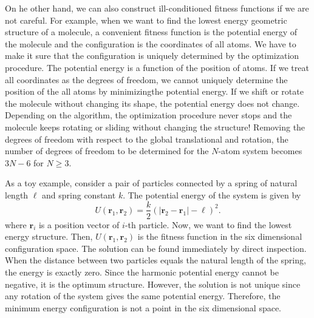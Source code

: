 On he other hand, we can also construct ill-conditioned fitness functions if we are not careful.  For example, when we want to find the lowest energy geometric structure of a molecule, a convenient fitness function is the potential energy of the molecule and the configuration is the coordinates of all atoms. We have to make it sure that the configuration is uniquely determined by the optimization procedure.  The potential energy is a function of the position of atoms.  If we treat all coordinates as the degrees of freedom, we cannot uniquely determine the position of the all atoms by minimizingthe  potential energy.  If we shift or rotate the molecule without changing its shape, the potential energy does not change.  Depending on the algorithm, the optimization procedure never stops and the molecule keeps rotating or sliding without changing the structure!
Removing the degrees of freedom with respect to the global translational and  rotation, the number of degrees of freedom to be determined for the $N$-atom system becomes $3N-6$ for $N\ge 3$. 

As a toy example, consider a pair of particles connected by a spring of natural length $\ell$ and spring constant $k$.  The potential energy of the system is given by
\begin{equation}
U(\mathbf{r}_1, \mathbf{r}_2) = \frac{k}{2} \left ( \left | \mathbf{r}_2-\mathbf{r}_1 \right | - \ell \right )^2.
\end{equation}
where $\mathbf{r}_i$ is a position vector of $i$-th particle.
Now, we want to find the lowest energy structure.  Then, $U(\mathbf{r}_1, \mathbf{r}_2)$ is the fitness function in the six dimensional configuration space.
The solution can be found immediately by direct inspection.  When the distance between two particles equals the natural length of the spring, the energy is exactly zero.  Since the harmonic potential energy cannot be negative, it is the optimum structure.  However, the solution is not unique since any rotation of the system gives the same potential energy.  Therefore, the minimum energy configuration is not a point in the six dimensional space.

